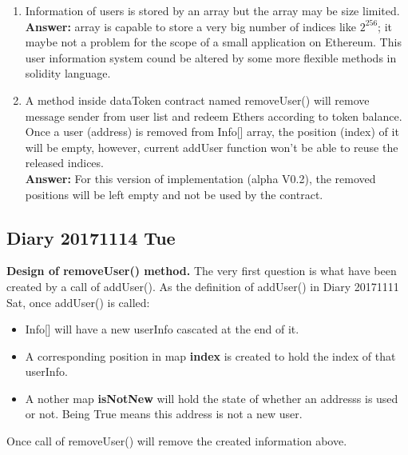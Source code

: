 \begin{enumerate}
    \item Information of users is stored by an array 
    but the array may be size limited.\\
    \textbf{Answer:} array is capable to store a very big number of 
    indices like $2^{256}$; it maybe not a problem for the scope of a
    small application on Ethereum. This user information system cound 
    be altered by some more flexible methods in solidity language.
    \item  A method inside dataToken contract named removeUser() will 
    remove message sender from user list and redeem Ethers according
    to token balance.
    Once a user (address) is removed from Info[] array,
    the position (index) of it 
    will be empty, however, current addUser function won't be able
    to reuse the released indices.\\
    \textbf{Answer:} For this version of implementation (alpha V0.2), the removed
    positions will be left empty and not be used by the contract. 
   
\end{enumerate}
\subsection{Diary 20171114 Tue}
\textbf{Design of removeUser() method.}
The very first question is what have been created
by a call of addUser(). As the definition of addUser() in Diary 20171111 Sat,
once addUser() is called:
\begin{itemize}
    \item Info[] will have a new userInfo cascated at the end of it. 
    \item A corresponding position in map \textbf{index} is created to hold 
    the index of that userInfo.
    \item A nother map \textbf{isNotNew} will hold the state of whether an
    addresss is used or not. Being True means this address is not a new user.
    \\
\end{itemize}
Once call of removeUser() will remove the created information above.




%


